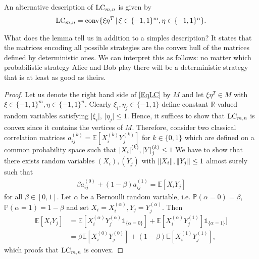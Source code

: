 \begin{lemma}\label{LemLC}
	An alternative description of $ \textup{LC}_{m,n} $ is given by 
	\begin{align}\label{EqLC}
		\textup{LC}_{m,n} = \textup{conv} \{  \xi\eta^T \, | \, \xi \in \{-1,1\}^m, \eta \in \{-1,1\}^n     \}.
	\end{align}
\end{lemma}
What does the lemma tell us in addition to a simples description? It states that the matrices encoding all possible strategies are the convex hull of the matrices defined by deterministic ones. We can interpret this as follows: no matter which probabilistic strategy Alice and Bob play there will be a deterministic strategy that is at least as good as theirs. 
\begin{proof}
	Let us denote the right hand side of \ref{EqLC} by $ M $ and let $ \xi\eta^T \in M $ with $ \xi \in \{-1,1\}^m, \eta \in \{-1,1\}^n $. Clearly $ \xi_i, \eta_j \in \{-1,1\} $ define constant $ \mathbb{R} $-valued random variables satisfying $ \vert \xi_i \vert, \, \vert \eta_j \vert \le 1 $. Hence, it suffices to show that $ \textup{LC}_{m,n} $ is convex since it contains the vertices of $ M $. Therefore, consider two classical correlation matrices $ a_{ij}^{(k)} = \mathbb{E}[X_i^{(k)}Y_{j}^{(k)}] $ for $ k \in \{0,1\} $ which are defined on a common probability space such that $ {\left|{X_i}\right|}^{(k)},{\left|{Y}\right|}_j^{(k)} \le 1 $ We have to show that there exists random variables $ (X_i),(Y_j) $ with $  \Vert {X_i} \Vert, \Vert {Y_j} \Vert \le 1 $ almost surely such that
	\begin{align}
		\beta a_{ij}^{(0)}+ (1-\beta)a_{ij}^{(1)} = \mathbb{E}[X_iY_j]
	\end{align}
	for all $ \beta \in [0,1] $.
	Let $ \alpha $ be a Bernoulli random variable, i.e. $ \mathbb{P}(\alpha = 0) = \beta $, $ \mathbb{P}(\alpha = 1) = 1 - \beta$ and set $ X_i = X_i^{(\alpha)}, Y_j = Y_j^{(\alpha)} $.
	Then 
	\begin{align*}
		\mathbb{E}[X_iY_j] &= \mathbb{E}[X_i^{(\alpha)}Y_j^{(\alpha)}  \mathds{1}_{ \{\alpha = 0\}}] + \mathbb{E}[X_i^{(\alpha)}Y_j^{(1)}]\mathds{1}_{\{\alpha = 1\}}] \\
		&= \beta \mathbb{E}[X_i^{(0)}Y_j^{(0)} ] + (1-\beta) \mathbb{E}[X_i^{(1)}Y_j^{(1)}],
	\end{align*} 
	which proofs that $ \textup{LC}_{m,n} $ is convex.
	
	
	

\end{proof}
